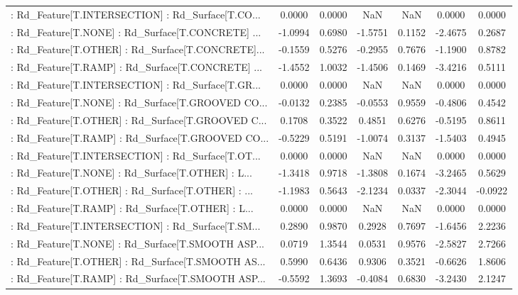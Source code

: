 \begin{longtable}{p{4cm}cccccc}
 : Rd\_Feature[T.INTERSECTION] : Rd\_Surface[T.CO... &  0.0000 &    0.0000 &     NaN &          NaN &  0.0000 &  0.0000 \\
 : Rd\_Feature[T.NONE] : Rd\_Surface[T.CONCRETE] ... & -1.0994 &    0.6980 & -1.5751 &       0.1152 & -2.4675 &  0.2687 \\
 : Rd\_Feature[T.OTHER] : Rd\_Surface[T.CONCRETE]... & -0.1559 &    0.5276 & -0.2955 &       0.7676 & -1.1900 &  0.8782 \\
 : Rd\_Feature[T.RAMP] : Rd\_Surface[T.CONCRETE] ... & -1.4552 &    1.0032 & -1.4506 &       0.1469 & -3.4216 &  0.5111 \\
 : Rd\_Feature[T.INTERSECTION] : Rd\_Surface[T.GR... &  0.0000 &    0.0000 &     NaN &          NaN &  0.0000 &  0.0000 \\
 : Rd\_Feature[T.NONE] : Rd\_Surface[T.GROOVED CO... & -0.0132 &    0.2385 & -0.0553 &       0.9559 & -0.4806 &  0.4542 \\
 : Rd\_Feature[T.OTHER] : Rd\_Surface[T.GROOVED C... &  0.1708 &    0.3522 &  0.4851 &       0.6276 & -0.5195 &  0.8611 \\
 : Rd\_Feature[T.RAMP] : Rd\_Surface[T.GROOVED CO... & -0.5229 &    0.5191 & -1.0074 &       0.3137 & -1.5403 &  0.4945 \\
 : Rd\_Feature[T.INTERSECTION] : Rd\_Surface[T.OT... &  0.0000 &    0.0000 &     NaN &          NaN &  0.0000 &  0.0000 \\
 : Rd\_Feature[T.NONE] : Rd\_Surface[T.OTHER] : L... & -1.3418 &    0.9718 & -1.3808 &       0.1674 & -3.2465 &  0.5629 \\
 : Rd\_Feature[T.OTHER] : Rd\_Surface[T.OTHER] : ... & -1.1983 &    0.5643 & -2.1234 &       0.0337 & -2.3044 & -0.0922 \\
 : Rd\_Feature[T.RAMP] : Rd\_Surface[T.OTHER] : L... &  0.0000 &    0.0000 &     NaN &          NaN &  0.0000 &  0.0000 \\
 : Rd\_Feature[T.INTERSECTION] : Rd\_Surface[T.SM... &  0.2890 &    0.9870 &  0.2928 &       0.7697 & -1.6456 &  2.2236 \\
 : Rd\_Feature[T.NONE] : Rd\_Surface[T.SMOOTH ASP... &  0.0719 &    1.3544 &  0.0531 &       0.9576 & -2.5827 &  2.7266 \\
 : Rd\_Feature[T.OTHER] : Rd\_Surface[T.SMOOTH AS... &  0.5990 &    0.6436 &  0.9306 &       0.3521 & -0.6626 &  1.8606 \\
 : Rd\_Feature[T.RAMP] : Rd\_Surface[T.SMOOTH ASP... & -0.5592 &    1.3693 & -0.4084 &       0.6830 & -3.2430 &  2.1247 \\

\end{longtable}
